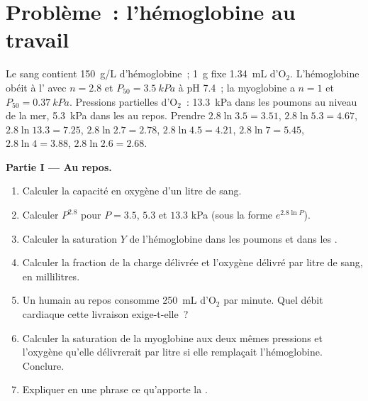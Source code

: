 \section{Problème~: l'hémoglobine au travail}

\begin{problem}
\label{pb:b1:proteins:1}
Le sang contient \qty{150}{g/L} d'hémoglobine~; \qty{1}{g} fixe
\qty{1.34}{mL} d'$\mathrm{O_2}$. L'hémoglobine obéit à l' avec $n = 2.8$ et $P_{50} = \qty{3.5}{kPa}$ à pH 7.4~; la
myoglobine a $n = 1$ et $P_{50} = \qty{0.37}{kPa}$. Pressions
partielles d'$\mathrm{O_2}$~: \qty{13.3}{kPa} dans les poumons au niveau
de la mer, \qty{5.3}{kPa} dans les  au repos. Prendre
$2.8\ln 3.5 = 3.51$,
$2.8\ln 5.3 = 4.67$, $2.8\ln 13.3 = 7.25$, $2.8\ln 2.7 = 2.78$,
$2.8\ln 4.5 = 4.21$, $2.8\ln 7 = 5.45$, $2.8\ln 4 = 3.88$,
$2.8\ln 2.6 = 2.68$.

\medskip
\noindent\textbf{Partie I --- Au repos.}
\begin{enumerate}
  \item Calculer la capacité en oxygène d'un litre de sang.
  \item Calculer $P^{2.8}$ pour $P = 3.5$, $5.3$ et $13.3$ kPa (sous la
        forme $e^{2.8\ln P}$).
  \item Calculer la saturation $Y$ de l'hémoglobine dans les poumons et
        dans les .
  \item Calculer la fraction de la charge délivrée et l'oxygène délivré
        par litre de sang, en millilitres.
  \item Un humain au repos consomme \qty{250}{mL} d'$\mathrm{O_2}$ par
        minute. Quel débit cardiaque cette livraison exige-t-elle~?
  \item Calculer la saturation de la myoglobine aux deux mêmes pressions
        et l'oxygène qu'elle délivrerait par litre si elle remplaçait
        l'hémoglobine. Conclure.
  \item Expliquer en une phrase ce qu'apporte la .
\end{enumerate}


\end{problem}
